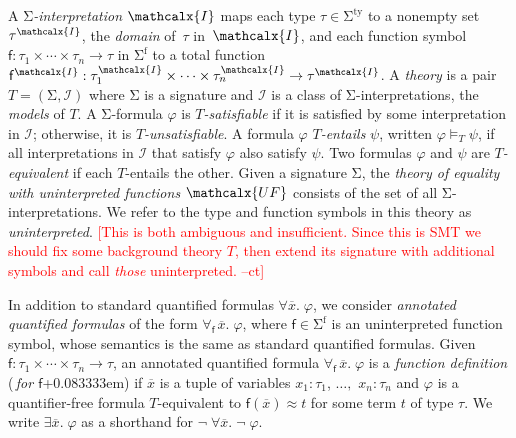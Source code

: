 \documentclass[runningheads,a4paper]{llncs}
\renewcommand\models{\mathrel{\vDash}}
\newcommand{\con}[1]{\mathsf{#1}}
\let\const=\con
\renewcommand\vec[1]{\overline{#1}}
\let\oldSigma=\Sigma
\def\Sigma{\mathrm{\oldSigma}}
\let\oldneg=\neg
\def\neg{\oldneg\;}
\newcommand{\teq}{\approx}
\newcommand{\I}{\mathcalx{I}}
\newcommand{\stypes}[1]{#1^\mathrm{ty}}
\newcommand{\sfuns}[1]{#1^\mathrm{f}}
\newcommand{\sfundefs}[1]{#1^\mathrm{dfn}}
\newcommand{\forallf}[1]{\forall_{\!#1\:}}
\newcommand{\rem}[1]{\textcolor{red}{[#1]}}
\newcommand{\ct}[1]{\rem{#1 --ct}}
\newcommand{\vthinspace}{\kern+0.083333em}
\newcommand{\Mo}{{\mathcal{I}}}
\newcommand{\euf}{\ensuremath{\mathcalx{UF}}\xspace}
\begin{document}

A \emph{$\Sigma$-interpretation $\I$} %
maps each type $\tau \in \stypes{\Sigma}$ to a nonempty set $\tau^\I$,
the \emph{domain} of~$\tau$ in~$\I$,
and each function symbol $\con{f} : \tau_1 \times \cdots \times \tau_n \rightarrow \tau$ in
$\sfuns{\Sigma}$
to a total function $\con{f}^\I : \tau_1^\I \times \cdots \times \tau_n^\I \rightarrow \tau^\I$.
A \emph{theory} is a pair $T = (\Sigma, \Mo)$ where
$\Sigma$ is a signature and $\Mo$ is a class of $\Sigma$-interpretations,
the \emph{models} of $T$.
A $\Sigma$-formula $\varphi$ is
\emph{$T$-satisfiable}
if it is satisfied by some interpretation in $\Mo$;
otherwise, it is \emph{$T$-unsatisfiable}.
A formula $\varphi$ \emph{$T$-entails} $\psi$, written $\varphi \models_T \psi$,
if all interpretations in $\Mo$ that satisfy $\varphi$ also satisfy $\psi$.
Two formulas $\varphi$ and $\psi$ are \emph{$T$-equivalent} 
if each $T$-entails the other.
Given a signature $\Sigma$,
the \emph{theory of equality with uninterpreted functions} \euf
consists of the set of all $\Sigma$-interpretations.
We refer to the type and function symbols in this theory as \emph{uninterpreted}.
\ct{This is both ambiguous and insufficient.
Since this is SMT we should fix some background theory $T$,
then extend its signature with additional symbols and call \emph{those} uninterpreted.
}

In addition to standard quantified formulas $\forall \vec x.\; \varphi$,
we consider \emph{annotated quantified formulas} of the form
$\forallf{\const{f}} \vec x.\; \varphi$, where $\con{f} \in \sfuns{\Sigma}$ is
an uninterpreted function symbol, 
whose semantics is the same as standard quantified formulas.
Given $\con{f} : \tau_1 \times \cdots \times \tau_n \rightarrow \tau$,
an annotated
quantified formula $\forallf{\con{f}} \vec x.\; \varphi$ is a \emph{function definition}
(\,\emph{for $\con{f}$}\vthinspace) if $\vec x$ is a tuple of variables
$x_1 : \tau_1$, $\ldots,$ $x_n : \tau_n$
and $\varphi$ is a quantifier-free formula 
$T$-equivalent to $\con{f}( \vec x ) \teq t$ for some term $t$ of type $\tau$.
We write $\exists
\vec x.\; \varphi$ as a shorthand for $\neg \forall \vec x.\; \neg \varphi$.
\end{document}
